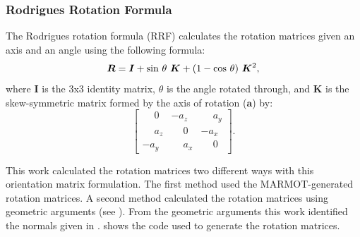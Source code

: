 \documentclass[12pt]{report}
\begin{document}
\subsubsection{Rodrigues Rotation Formula\label{PQ:RRF}}
The Rodrigues rotation formula\cite{belongie2006} (RRF) calculates the rotation matrices given an axis and an angle using the following formula:
\begin{equation}
\label{eq:rrf}
\bm{R} = \bm{I} + \textnormal{sin}\ \theta\ \bm{K} + (1 - \textnormal{cos}\ \theta)\ \bm{K}^2,
\end{equation}
where $\bm{I}$ is the 3x3 identity matrix, $\theta$ is the angle rotated through, and $\bm{K}$ is the skew-symmetric matrix formed by the axis of rotation ($\bm{a}$) by:
\begin{equation}
\label{eq:skewSymMat}
\left[
\begin{array}{ccc}
\phantom{-}0 & -a_z & \phantom{-}a_y \\
\phantom{-}a_z & \phantom{-}0 & -a_x \\
-a_y & \phantom{-}a_x & \phantom{-}0
\end{array}
\right].
\end{equation}

This work calculated the rotation matrices two different ways with this orientation matrix formulation.  The first method used the MARMOT-generated rotation matrices.  A second method calculated the rotation matrices using geometric arguments (see ).  From the geometric arguments this work identified the normals given in .   shows the code used to generate the rotation matrices.
\end{document}
